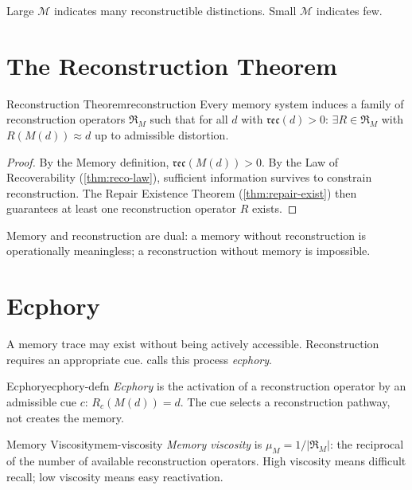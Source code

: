 \documentclass[12pt,twoside,openright]{book}
\newcommand{\reco}{\mathfrak{rec}}
\begin{document}
Large $\mathcal{M}$ indicates many reconstructible
distinctions. Small $\mathcal{M}$ indicates few.

\section{The Reconstruction Theorem}
\label{sec:ch6-reconstruction}

\begin{theorem}{Reconstruction Theorem}{reconstruction}
  Every memory system induces a family of reconstruction
  operators $\mathfrak{R}_M$ such that for all $d$ with
  $\reco(d) > 0$: $\exists R \in \mathfrak{R}_M$ with
  $R(M(d)) \approx d$ up to admissible distortion.
\end{theorem}

\begin{proof}
  By the Memory definition, $\reco(M(d)) > 0$.
  By the Law of Recoverability (\cref{thm:reco-law}),
  sufficient information survives to constrain
  reconstruction. The Repair Existence Theorem
  (\cref{thm:repair-exist}) then guarantees at least
  one reconstruction operator $R$ exists.
\end{proof}

Memory and reconstruction are dual: a memory without
reconstruction is operationally meaningless; a reconstruction
without memory is impossible.

\section{Ecphory}
\label{sec:ch6-ecphory}

A memory trace may exist without being actively accessible.
Reconstruction requires an appropriate cue.
\textcite{tulving1983} calls this process \emph{ecphory}.

\begin{definition}{Ecphory}{ecphory-defn}
  \emph{Ecphory} is the activation of a reconstruction
  operator by an admissible cue $c$:
  $R_c(M(d)) = d$.
  The cue selects a reconstruction pathway, not creates
  the memory. 
\end{definition}

\begin{definition}{Memory Viscosity}{mem-viscosity}
  \emph{Memory viscosity} is $\mu_M = 1/|\mathfrak{R}_M|$:
  the reciprocal of the number of available reconstruction
  operators. High viscosity means difficult recall; low
  viscosity means easy reactivation.
\end{definition}
\end{document}
